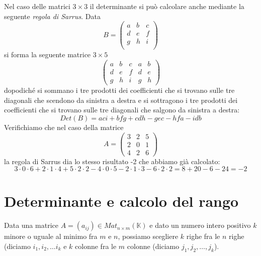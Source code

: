 \begin{observation}
	Nel caso delle matrici $3 \times 3$ il determinante si pu\`o calcolare
	anche mediante la seguente \emph{regola di Sarrus}. Data
	\begin{equation*}
		B = \begin{pmatrix}
			a & b & c \\
			d & e & f \\
			g & h & i \\
		\end{pmatrix}
	\end{equation*}
	si forma la seguente matrice $3 \times 5$
	\begin{equation*}
		\begin{pmatrix}
			a & b & c & a & b \\
			d & e & f & d & e \\
			g & h & i & g & h
		\end{pmatrix}
	\end{equation*}
	dopodich\'e si sommano i tre prodotti dei coefficienti che si trovano sulle
	tre diagonali che scendono da sinistra a destra e si sottragono i tre
	prodotti dei coefficienti che si trovano sulle tre diagonali che salgono
	da sinistra a destra:
	\begin{equation*}
		Det(B) = aci + bfg + cdh - gec - hfa - idb
	\end{equation*}
	Verifichiamo che nel caso della matrice
	\begin{equation*}
		A = \begin{pmatrix}
			3 & 2 & 5 \\
			2 & 0 & 1 \\
			4 & 2 & 6
		\end{pmatrix}
	\end{equation*}
	la regola di Sarrus dia lo stesso risultato -2 che abbiamo gi\`a calcolato:
	\begin{equation*}
		3 \cdot 0 \cdot 6 + 2 \cdot 1 \cdot 4 + 5 \cdot 2 \cdot 2 -
		4 \cdot 0 \cdot 5 - 2 \cdot 1 \cdot 3 - 6 \cdot 2 \cdot 2 =
		8 + 20 - 6 - 24 = -2
	\end{equation*}
\end{observation}

\section{Determinante e calcolo del rango}
Data una matrice $A = (a_{ij}) \in Mat_{n \times m}(\mathbb{K})$ e dato un
numero intero positivo $k$ minore o uguale al minimo fra $m$ e $n$, possiamo
scegliere $k$ righe fra le $n$ righe (diciamo $i_1, i_2, \dots i_k$ e
$k$ colonne fra le $m$ colonne (diciamo $j_1, j_2, \dots, j_k$).

